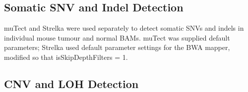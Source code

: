 \documentclass[thesis.tex]{subfiles}
\begin{document}
\subsection{Somatic SNV and Indel Detection}

muTect and Strelka were used separately to detect somatic SNVs and indels in individual mouse tumour and normal BAMs.  muTect was supplied default parameters; Strelka used default parameter settings for the BWA mapper, modified so that isSkipDepthFilters = 1.  



\subsection{CNV and LOH Detection}
\end{document}
